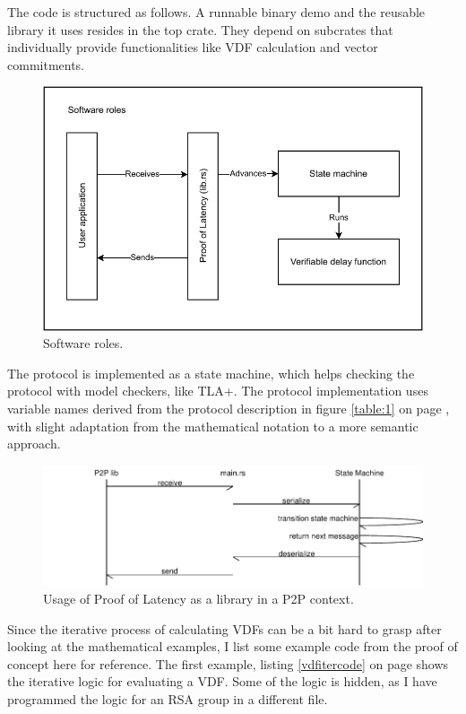 The code is structured as follows. A runnable binary demo and the reusable library it uses resides in the top crate. They depend on subcrates that individually provide functionalities like VDF calculation and vector commitments.

\begin{figure}
	\includegraphics[width=\textwidth]{pictures/PoL_software_roles.pdf}
	\caption{Software roles.}
	\label{software_roles}
\end{figure}

The protocol is implemented as a state machine, which helps checking the protocol with model checkers, like TLA+. %
The protocol implementation uses variable names derived from the protocol description in figure \ref{table:1} on page \pageref{table:1}, with slight adaptation from the mathematical notation to a more semantic approach.

\begin{figure}
	\includegraphics[width=\textwidth]{pictures/message_flow-eps-converted-to.pdf}
	\caption{Usage of Proof of Latency as a library in a P2P context.}
	\label{message_flow}
\end{figure}

Since the iterative process of calculating VDFs can be a bit hard to grasp after looking at the mathematical examples, I list some example code from the proof of concept here for reference. The first example, listing \ref{vdfitercode} on page \pageref{vdfitercode} shows the iterative logic for evaluating a VDF. Some of the logic is hidden, as I have programmed the logic for an RSA group in a different file. 


